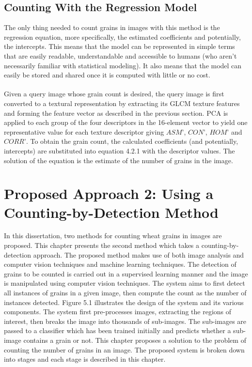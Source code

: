 \goodbreak
\section{Counting With the Regression Model}
The only thing needed to count grains in images with this method is the regression equation, more specifically, the estimated coefficients and potentially, the intercepts. This means that the model can be represented in simple terms that are easily readable, understandable and accessible to humans (who aren't necessarily familiar with statistical modeling). It also means that the model can easily be stored and shared once it is computed with little or no cost.\\ \\
%
Given a query image whose grain count is desired, the query image is first converted to a textural representation by extracting its GLCM texture features and forming the feature vector as described in the previous section. PCA is applied to each group of the four descriptors in the 16-element vector to yield one representative value for each texture descriptor giving $ASM\text{'}$, $CON\text{'}$, $HOM\text{'}$ and $CORR\text{'}$. To obtain the grain count, the calculated coefficients (and potentially, intercepts) are substituted into equation 4.2.1 with the descriptor values. The solution of the equation is the estimate of the number of grains in the image. 
\bigskip



\def\baselinestretch{1}

\chapter{Proposed Approach 2: Using a Counting-by-Detection Method}
\def\baselinestretch{1.66}



In this dissertation, two methods for counting wheat grains in images are proposed. This chapter presents the second method which takes a counting-by-detection approach. The proposed method makes use of both image analysis and computer vision techniques and machine learning techniques. The detection of grains to be counted is carried out in a supervised learning manner and the image is manipulated using computer vision techniques. The system aims to first detect all instances of grains in a given image, then compute the count as the number of instances detected. Figure 5.1 illustrates the design of the system and its various components. The system first pre-processes images, extracting the regions of interest, then breaks the image into  thousands of sub-images. The sub-images are passed to a classifier which has been trained initially and predicts whether a sub-image contains a grain or not. This chapter proposes a solution to the problem of counting the number of grains in an image. The proposed system is broken down into stages and each stage is described in this chapter.


